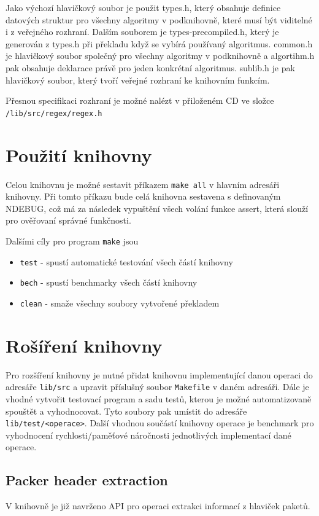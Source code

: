 Jako výchozí hlavičkový soubor je použit types.h, který obsahuje definice datových struktur pro všechny algoritmy v podknihovně, které musí být viditelné i z veřejného rozhraní. Dalším souborem je types-precompiled.h, který je generován z types.h při překladu když se vybírá používaný algoritmus. common.h je hlavičkový soubor společný pro všechny algoritmy v podknihovně a algortihm.h pak obsahuje deklarace právě pro jeden konkrétní algoritmus.
sublib.h je pak hlavičkový soubor, který tvoří veřejné rozhraní ke knihovním funkcím.

Přesnou specifikaci rozhraní je možné nalézt v přiloženém CD ve složce \texttt{/lib/src/regex/regex.h}

\section{Použití knihovny}
Celou knihovnu je možné sestavit příkazem \texttt{make all} v hlavním adresáři knihovny.
Při tomto příkazu bude celá knihovna sestavena s definovaným NDEBUG, což má za následek vypuštění všech
volání funkce assert, která slouží pro ověřovaní správné funkčnosti.

Dalšími cíly pro program \texttt{make} jsou

\begin{itemize}
	\item{\texttt{test} - spustí automatické testování všech částí knihovny}
	\item{\texttt{bech} - spustí benchmarky všech částí knihovny}
	\item{\texttt{clean} - smaže všechny soubory vytvořené překladem}
\end{itemize}

\section{Rošíření knihovny}

Pro rozšíření knihovny je nutné přidat knihovnu implementující danou operaci
do adresáře \texttt{lib/src} a upravit příslušný soubor \texttt{Makefile} v daném adresáři.
Dále je vhodné vytvořit testovací program a sadu testů, kterou je možné automatizovaně spouštět a vyhodnocovat.
Tyto soubory pak umístit do adresáře \texttt{lib/test/<operace>}.
Další vhodnou součástí knihovny operace je benchmark pro vyhodnocení rychlosti/paměťové náročnosti jednotlivých
implementací dané operace.

\subsection{Packer header extraction}
V knihovně je již navrženo API pro operaci extrakci informací z hlaviček paketů.

